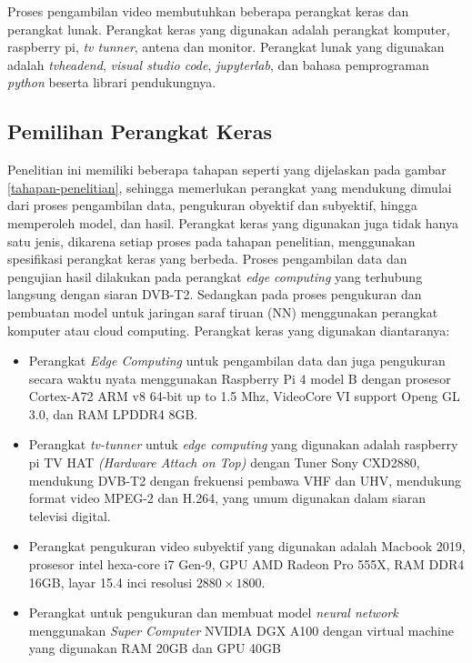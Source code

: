 Proses pengambilan video membutuhkan beberapa perangkat keras dan perangkat lunak. Perangkat keras yang digunakan adalah perangkat komputer, raspberry pi, \textit{tv tunner}, antena dan monitor. Perangkat lunak yang digunakan adalah \textit{tvheadend}, \textit{visual studio code}, \textit{jupyterlab}, dan bahasa pemprograman \textit{python} beserta librari pendukungnya.


\subsection{Pemilihan Perangkat Keras}
\hspace{1,2cm}
Penelitian ini memiliki beberapa tahapan seperti yang dijelaskan pada gambar \ref{tahapan-penelitian}, sehingga memerlukan perangkat yang mendukung dimulai dari proses pengambilan data, pengukuran obyektif dan subyektif, hingga memperoleh model, dan hasil. Perangkat keras yang digunakan juga tidak hanya satu jenis, dikarena setiap proses pada tahapan penelitian, menggunakan spesifikasi perangkat keras yang berbeda. Proses pengambilan data dan pengujian hasil dilakukan pada perangkat \textit{edge computing} yang terhubung langsung dengan siaran DVB-T2. Sedangkan pada proses pengukuran dan pembuatan model untuk jaringan saraf tiruan (NN) menggunakan perangkat komputer atau cloud computing. Perangkat keras yang digunakan diantaranya:

\begin{itemize}
	\item Perangkat \textit{Edge Computing} untuk pengambilan data dan juga pengukuran secara waktu nyata menggunakan Raspberry Pi 4 model B dengan prosesor Cortex-A72 ARM v8 64-bit up to 1.5 Mhz, VideoCore VI support Openg GL 3.0, dan RAM LPDDR4 8GB.
	\item Perangkat \textit{tv-tunner} untuk \textit{edge computing} yang digunakan adalah raspberry pi TV HAT \textit{(Hardware Attach on Top)} dengan Tuner Sony CXD2880, mendukung DVB-T2 dengan frekuensi pembawa VHF dan UHV, mendukung format video MPEG-2 dan H.264, yang umum digunakan dalam siaran televisi digital.
	\item Perangkat pengukuran video subyektif  yang digunakan adalah Macbook 2019, prosesor intel hexa-core i7 Gen-9, GPU AMD Radeon Pro 555X, RAM DDR4 16GB, layar 15.4 inci resolusi $2880\times1800$.
	\item Perangkat untuk pengukuran dan  membuat model \textit{neural network} menggunakan \textit{Super Computer }NVIDIA DGX A100 dengan virtual machine yang digunakan RAM 20GB dan GPU 40GB
	
\end{itemize}

